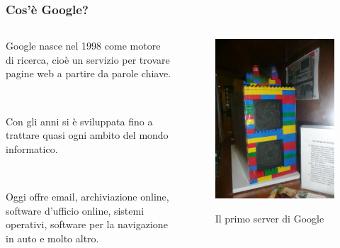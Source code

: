 \documentclass[handout]{beamer}
\begin{document}
\begin{frame}
\frametitle{Cos'è Google?}
\begin{columns}
  \begin{column}{.5\textwidth}
    Google nasce nel 1998 come \alert{motore di ricerca}, cioè un servizio per trovare pagine web a partire da parole chiave.\pause

~

Con gli anni si è sviluppata fino a trattare quasi ogni ambito del mondo informatico.\pause

~

Oggi offre email, archiviazione online, software d'ufficio online, sistemi operativi, software per la navigazione in auto e molto altro.
  \end{column}
  \begin{column}{.4\textwidth}
    \begin{figure}
      \includegraphics[width=\columnwidth]{img/servergoogle.jpg}

      Il primo server di Google
    \end{figure}
  \end{column}
  \end{columns}
\end{frame}
\end{document}
